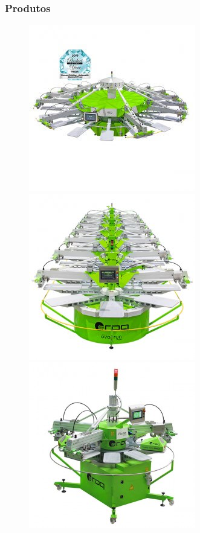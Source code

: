 \begin{frame}
\frametitle{Produtos}
\begin{figure}[ht]
\begin{center}
\includegraphics[scale=0.2]{"./image/ROQ/maquinas/ECO-P18_600x600-2-275x275.jpg"}
\includegraphics[scale=0.2]{"./image/ROQ/maquinas/EVO-600x600-275x275.jpg"}
\includegraphics[scale=0.2]{"./image/ROQ/maquinas/nanop10-275x275.jpg"}

\end{center}
\end{figure}
\end{frame}
